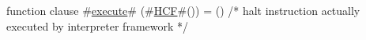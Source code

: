 function clause #\hyperref[zexecute]{execute}# (#\hyperref[zHCF]{HCF}#()) =
  () /* halt instruction actually executed by interpreter framework */
